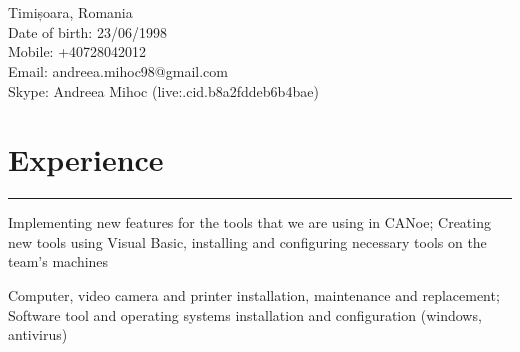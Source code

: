 \documentclass[]{mihocandreea-resume}
\begin{document}
\hfill
\begin{minipage}[t]{0.66\textwidth} 
\hspace*{0pt}\hfill    \\
\hspace*{0pt}\hfill    \\
\hspace*{0pt}\hfill Timișoara, Romania \\
\hspace*{0pt}\hfill Date of birth: 23/06/1998\\
\hspace*{0pt}\hfill Mobile: +40728042012 \\
\hspace*{0pt}\hfill Email: andreea.mihoc98@gmail.com \\
\hspace*{0pt}\hfill Skype: Andreea Mihoc (live:.cid.b8a2fddeb6b4bae)
\section{Experience}
\noindent\rule{12.5cm}{0.4pt}
 
\noindent
\hspace{5em}%
\begin{minipage}{0.85\textwidth\vspace{2pt}}
Implementing new features for the tools that we are using in CANoe;
Creating new tools using Visual Basic, installing and configuring necessary tools on the team's machines 
\end{minipage}
\sectionsep

 
\noindent
\hspace{5em}%
\begin{minipage}{0.85\textwidth\vspace{2pt}}
Computer, video camera and printer installation, maintenance and replacement;
Software tool and operating systems installation and configuration (windows, antivirus)
\end{minipage}

\end{minipage}
\end{document}
